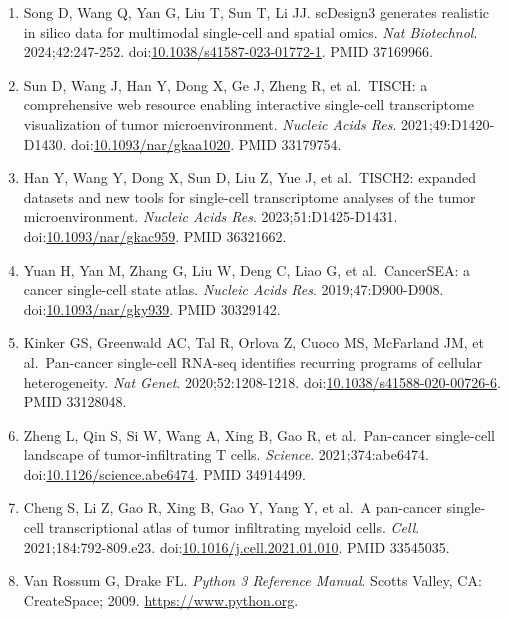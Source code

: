 \documentclass[11pt]{article}
\begin{document}
\begin{enumerate}
  gene correlations captured. \emph{Genome Biol}. 2021;22:163.
  doi:\href{https://doi.org/10.1186/s13059-021-02367-2}{10.1186/s13059-021-02367-2}.
  PMID 34034771.
\item
  Song D, Wang Q, Yan G, Liu T, Sun T, Li JJ. scDesign3 generates
  realistic in silico data for multimodal single-cell and spatial omics.
  \emph{Nat Biotechnol}. 2024;42:247-252.
  doi:\href{https://doi.org/10.1038/s41587-023-01772-1}{10.1038/s41587-023-01772-1}.
  PMID 37169966.
\item
  Sun D, Wang J, Han Y, Dong X, Ge J, Zheng R, et al.~TISCH: a
  comprehensive web resource enabling interactive single-cell
  transcriptome visualization of tumor microenvironment. \emph{Nucleic
  Acids Res}. 2021;49:D1420-D1430.
  doi:\href{https://doi.org/10.1093/nar/gkaa1020}{10.1093/nar/gkaa1020}.
  PMID 33179754.
\item
  Han Y, Wang Y, Dong X, Sun D, Liu Z, Yue J, et al.~TISCH2: expanded
  datasets and new tools for single-cell transcriptome analyses of the
  tumor microenvironment. \emph{Nucleic Acids Res}. 2023;51:D1425-D1431.
  doi:\href{https://doi.org/10.1093/nar/gkac959}{10.1093/nar/gkac959}.
  PMID 36321662.
\item
  Yuan H, Yan M, Zhang G, Liu W, Deng C, Liao G, et al.~CancerSEA: a
  cancer single-cell state atlas. \emph{Nucleic Acids Res}.
  2019;47:D900-D908.
  doi:\href{https://doi.org/10.1093/nar/gky939}{10.1093/nar/gky939}.
  PMID 30329142.
\item
  Kinker GS, Greenwald AC, Tal R, Orlova Z, Cuoco MS, McFarland JM, et
  al.~Pan-cancer single-cell RNA-seq identifies recurring programs of
  cellular heterogeneity. \emph{Nat Genet}. 2020;52:1208-1218.
  doi:\href{https://doi.org/10.1038/s41588-020-00726-6}{10.1038/s41588-020-00726-6}.
  PMID 33128048.
\item
  Zheng L, Qin S, Si W, Wang A, Xing B, Gao R, et al.~Pan-cancer
  single-cell landscape of tumor-infiltrating T cells. \emph{Science}.
  2021;374:abe6474.
  doi:\href{https://doi.org/10.1126/science.abe6474}{10.1126/science.abe6474}.
  PMID 34914499.
\item
  Cheng S, Li Z, Gao R, Xing B, Gao Y, Yang Y, et al.~A pan-cancer
  single-cell transcriptional atlas of tumor infiltrating myeloid cells.
  \emph{Cell}. 2021;184:792-809.e23.
  doi:\href{https://doi.org/10.1016/j.cell.2021.01.010}{10.1016/j.cell.2021.01.010}.
  PMID 33545035.
\item
  Van Rossum G, Drake FL. \emph{Python 3 Reference Manual}. Scotts
  Valley, CA: CreateSpace; 2009. \url{https://www.python.org}.

\end{enumerate}
\end{document}
